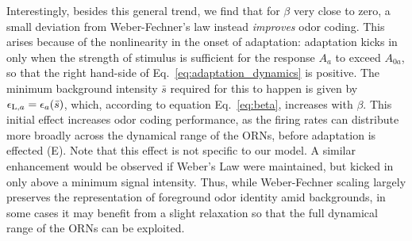 \documentclass[9pt,lineno]{elife}
\begin{document}
Interestingly, besides this general trend, we find that for $\beta$ very close to zero, a small deviation from Weber-Fechner's law instead \textit{improves} odor coding. This arises because of the nonlinearity in the onset of adaptation: adaptation kicks in only when the strength of stimulus is sufficient for the response $A_a$ to exceed $A_{0a}$, so that the right hand-side of Eq.~\ref{eq:adaptation_dynamics} is positive. The minimum background intensity $\bar{s}$ required for this to happen is given by $\epsilon_{\textup{L}, a}=\epsilon_a(\bar{s})$, which, according to equation Eq.~\ref{eq:beta}, increases with $\beta$. This initial effect increases odor coding performance, as the firing rates can distribute more broadly across the dynamical range of the ORNs, before adaptation is effected (E). {\color{blue} Note that this effect is not specific to our model. A similar enhancement would be observed if Weber's Law were maintained, but kicked in only above a minimum signal intensity.} Thus, while Weber-Fechner scaling largely preserves the representation of foreground odor identity amid backgrounds, in some cases it may benefit from a slight relaxation so that the full dynamical range of the ORNs can be exploited.






\end{document}
